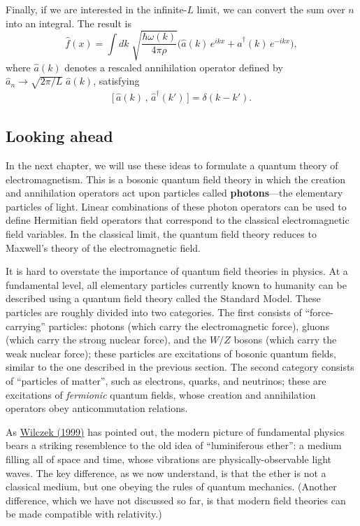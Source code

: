 \documentclass[pra,12pt]{revtex4}
\begin{document}
Finally, if we are interested in the infinite-$L$ limit, we can
convert the sum over $n$ into an integral.
The result is
\begin{equation}
  \hat{f}(x) = \int dk\; \sqrt{\frac{\hbar\omega(k)}{4\pi\rho}}
  \Big(\hat{a}(k)\, e^{ik x} + \hat{a}^\dagger(k)\, e^{-ik x} \Big),
\end{equation}
where $\hat{a}(k)$ denotes a rescaled annihilation operator defined by
$\hat{a}_n \rightarrow \sqrt{2\pi/L}\; \hat{a}(k)$, satisfying
\begin{align}
  \Big[\,\hat{a}(k)\,,\, \hat{a}^\dagger(k')\,\Big] = \delta(k-k').
\end{align}

\subsection{Looking ahead}

In the next chapter, we will use these ideas to formulate a quantum
theory of electromagnetism.  This is a bosonic quantum field theory in
which the creation and annihilation operators act upon particles
called \textbf{photons}---the elementary particles of light.  Linear
combinations of these photon operators can be used to define Hermitian
field operators that correspond to the classical electromagnetic field
variables.  In the classical limit, the quantum field theory reduces
to Maxwell's theory of the electromagnetic field.

It is hard to overstate the importance of quantum field theories in
physics.  At a fundamental level, all elementary particles currently
known to humanity can be described using a quantum field theory called
the Standard Model.  These particles are roughly divided into two
categories.  The first consists of ``force-carrying'' particles:
photons (which carry the electromagnetic force), gluons (which carry
the strong nuclear force), and the $W/Z$ bosons (which carry the weak
nuclear force); these particles are excitations of bosonic quantum
fields, similar to the one described in the previous section.  The
second category consists of ``particles of matter'', such as
electrons, quarks, and neutrinos; these are excitations of
\textit{fermionic} quantum fields, whose creation and annihilation
operators obey anticommutation relations.

As \hyperref[cite:wilczek]{Wilczek (1999)} has pointed out, the modern
picture of fundamental physics bears a striking resemblence to the old
idea of ``luminiferous ether'': a medium filling all of space and
time, whose vibrations are physically-observable light waves.  The key
difference, as we now understand, is that the ether is not a classical
medium, but one obeying the rules of quantum mechanics.  (Another
difference, which we have not discussed so far, is that modern field
theories can be made compatible with relativity.)
\end{document}
